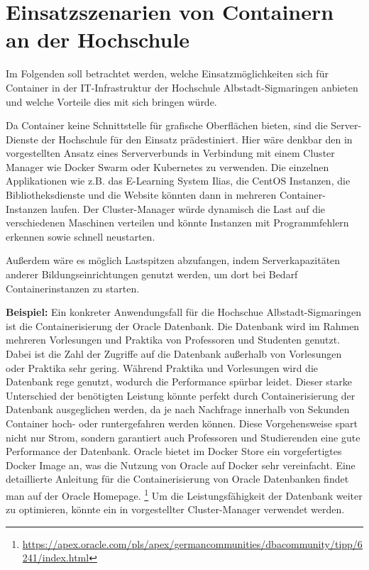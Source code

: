 \section{Einsatzszenarien von Containern an der Hochschule}
\label{sec:HS}
Im Folgenden soll betrachtet werden, welche Einsatzmöglichkeiten sich für Container in der IT-Infrastruktur der Hochschule Albstadt-Sigmaringen anbieten und welche Vorteile dies mit sich bringen würde. 

Da Container keine Schnittstelle für grafische Oberflächen bieten, sind die Server-Dienste der Hochschule für den Einsatz prädestiniert.
Hier wäre denkbar den in  vorgestellten Ansatz eines Serververbunds in Verbindung mit einem Cluster Manager wie Docker Swarm oder Kubernetes zu verwenden.
Die einzelnen Applikationen wie z.B. das E-Learning System Ilias, die CentOS Instanzen, die Bibliotheksdienste und die Website könnten dann in mehreren Container-Instanzen laufen.
Der Cluster-Manager würde dynamisch die Last auf die verschiedenen Maschinen verteilen und könnte Instanzen mit Programmfehlern erkennen sowie schnell neustarten.

Außerdem wäre es möglich Lastspitzen abzufangen, indem Serverkapazitäten anderer Bildungseinrichtungen genutzt werden, um dort bei Bedarf Containerinstanzen zu starten.

\textbf{Beispiel:}\newline
Ein konkreter Anwendungsfall für die Hochschue Albstadt-Sigmaringen ist die Containerisierung der Oracle Datenbank. Die Datenbank wird im Rahmen mehreren Vorlesungen und Praktika von Professoren und Studenten genutzt.
Dabei ist die Zahl der Zugriffe auf die Datenbank außerhalb von Vorlesungen oder Praktika sehr gering.
Während Praktika und Vorlesungen wird die Datenbank rege genutzt, wodurch die Performance spürbar leidet.
Dieser starke Unterschied der benötigten Leistung könnte perfekt durch Containerisierung der Datenbank ausgeglichen werden, da je nach Nachfrage innerhalb von Sekunden Container hoch- oder runtergefahren werden können.
Diese Vorgehensweise spart nicht nur Strom, sondern garantiert auch Professoren und Studierenden eine gute Performance der Datenbank. Oracle bietet im Docker Store ein vorgefertigtes Docker Image an, was die Nutzung von Oracle auf Docker sehr vereinfacht.
Eine detaillierte Anleitung für die Containerisierung von Oracle Datenbanken findet man auf der Oracle Homepage.
\footnote{\url{https://apex.oracle.com/pls/apex/germancommunities/dbacommunity/tipp/6241/index.html}}
Um die Leistungsfähigkeit der Datenbank weiter zu optimieren, könnte ein in  vorgestellter Cluster-Manager verwendet werden.
